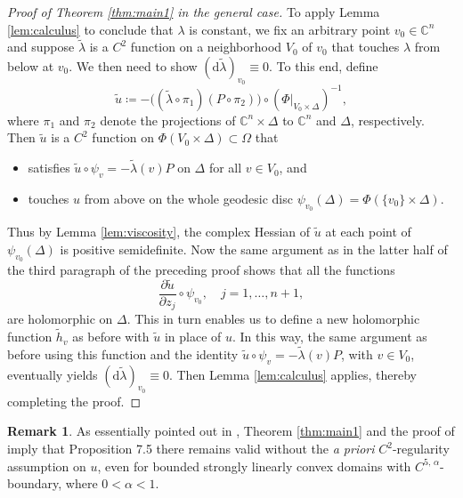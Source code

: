 \documentclass[12pt,a4paper]{amsart}
\numberwithin{equation}{section}
\theoremstyle{definition}
\newtheorem*{remark}{Remark}
\newcommand{\dd}{\mathrm d}
\begin{document}
\begin{proof}[Proof of Theorem \ref{thm:main1} in the general case]
To apply Lemma \ref{lem:calculus} to conclude that $\lambda$ is constant, we fix an arbitrary point $v_0\in\mathbb{C}^n$ and suppose $\widetilde\lambda$ is a $C^2$ function on a neighborhood $V_0$ of $v_0$ that touches $\lambda$ from below at $v_0$. We then need to show $(\dd\widetilde\lambda)_{v_0}\equiv 0$. To this end, define
\[
\widetilde u \coloneqq -\big((\widetilde\lambda\circ\pi_1)(P\circ\pi_2)\big)\circ(\left.\Phi\right|_{V_0\times\Delta})^{-1},
\]
where $\pi_1$ and $\pi_2$ denote the projections of $\mathbb{C}^n\times\Delta$ to $\mathbb{C}^n$ and $\Delta$, respectively. Then $\widetilde u$ is a $C^2$ function on $\Phi(V_0\times\Delta)\subset\Omega$ that
\begin{itemize}[leftmargin=1.5pc, parsep=4pt]
  \item satisfies $\widetilde u\circ\psi_v=-\widetilde\lambda(v)P$ on $\Delta$ for all $v\in V_0$, and
  \item touches $u$ from above on the whole geodesic disc $\psi_{v_0}(\Delta)=\Phi(\{v_0\}\times\Delta)$.
\end{itemize}
Thus by Lemma \ref{lem:viscosity}, the complex Hessian of $\widetilde u$ at each point of $\psi_{v_0}(\Delta)$ is positive semidefinite. Now the same argument as in the latter half of the third paragraph of the preceding proof shows that all the functions
\[
\frac{\partial\widetilde u}{\partial z_j}\circ\psi_{v_0}, \quad j=1,\ldots,n+1,
\]
are holomorphic on $\Delta$. This in turn enables us to define a new holomorphic function $\widetilde h_v$ as before with $\widetilde u$ in place of $u$. In this way, the same argument as before using this function and the identity $\widetilde u\circ\psi_v=-\widetilde\lambda(v)P$, with $v\in V_0$, eventually yields $(\dd\widetilde\lambda)_{v_0}\equiv0$. Then Lemma \ref{lem:calculus} applies, thereby completing the proof.
\end{proof}




\begin{remark}
As essentially pointed out in \cite[pp. 1001--1002]{Bracci-Trans09},  Theorem \ref{thm:main1} and the proof of  \cite[Proposition 7.4]{Bracci-Trans09} imply that Proposition 7.5 there remains valid without the {\it a priori} $C^2$-regularity assumption on $u$, even for bounded strongly linearly convex domains with $C^{5,\,\alpha}$-boundary, where $0<\alpha<1$.
\end{remark}
\end{document}
